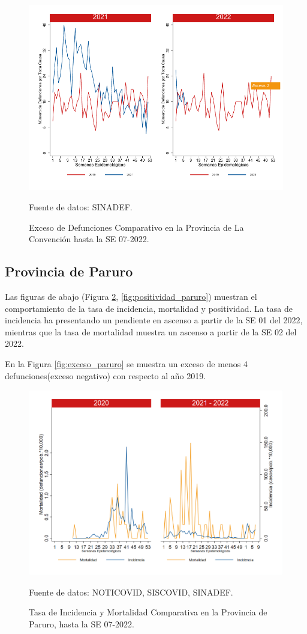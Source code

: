 \documentclass[12pt,a4paper,openany]{book}
\begin{document}
		\begin{figure}[h]
			\caption{Exceso de Defunciones Comparativo en la Provincia de La Convención hasta la SE 07-2022.}\label{fig:exceso_laconv}
			\begin{center}
				\includegraphics[width=0.7\linewidth]{../figuras/exceso_9.pdf}
			\end{center}
			{\footnotesize {Fuente de datos: SINADEF.}}
		\end{figure}
		
		\clearpage
		
		\subsection*{Provincia de Paruro}
		\noindent Las figuras de abajo (Figura \ref{fig:inc_mort_paruro}, \ref{fig:positividad_paruro}) muestran el comportamiento de la tasa de incidencia, mortalidad y positividad. La tasa de incidencia ha presentando un pendiente en ascenso a partir de la SE 01 del 2022, mientras que la tasa de mortalidad muestra un ascenso a partir de la SE 02 del 2022.  
	 
	 En la Figura \ref{fig:exceso_paruro} se muestra un exceso de menos 4 defunciones(exceso negativo) con respecto al año 2019.
		
		\begin{figure}[h]
			\caption{Tasa de Incidencia y Mortalidad Comparativa en la Provincia de Paruro, hasta la SE 07-2022.}\label{fig:inc_mort_paruro}
			\begin{center}
				\includegraphics[width=0.7\linewidth]{../figuras/incidencia_mortalidad_20_21_10.png}
			\end{center}
			{\footnotesize {Fuente de datos: NOTICOVID, SISCOVID, SINADEF.}} 
		\end{figure}
		
\end{document}
